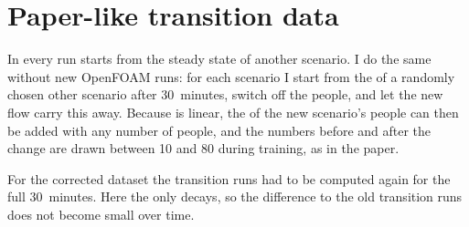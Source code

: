 \section{Paper-like transition data}
In \citet{bian2025} every run starts from the steady state of another scenario. I do the same without new
OpenFOAM runs: for each scenario I start from the \cotwo{} of a randomly chosen other scenario after 30~minutes,
switch off the people, and let the new flow carry this \cotwo{} away. Because  is linear, the
\cotwo{} of the new scenario's people can then be added with any number of people, and the numbers before and
after the change are drawn between 10 and 80 during training, as in the paper.

For the corrected dataset the transition runs had to be computed again for the full 30~minutes. Here the
\cotwo{} only decays, so the difference to the old transition runs does not become small over time.
